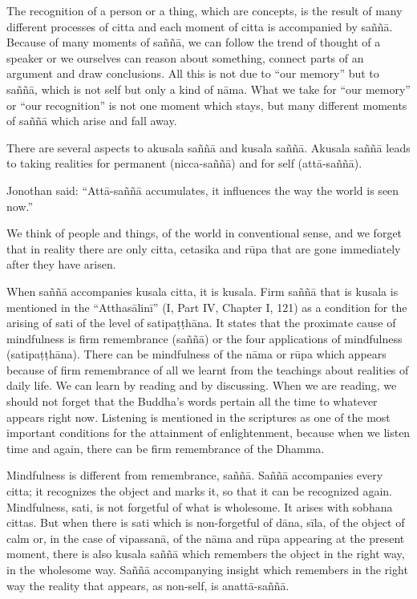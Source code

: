 The recognition of a person or a thing, which are concepts, is the
result of many different processes of citta and each moment of citta is
accompanied by saññā. Because of many moments of saññā, we can follow
the trend of thought of a speaker or we ourselves can reason about
something, connect parts of an argument and draw conclusions. All this
is not due to ``our memory'' but to saññā, which is not self but only a
kind of nāma. What we take for ``our memory'' or ``our recognition'' is
not one moment which stays, but many different moments of saññā which
arise and fall away.

There are several aspects to akusala saññā and kusala saññā. Akusala
saññā leads to taking realities for permanent (nicca-saññā) and for self
(attā-saññā).

Jonothan said: ``Attā-saññā accumulates, it influences the way the world
is seen now.''

We think of people and things, of the world in conventional sense, and
we forget that in reality there are only citta, cetasika and rūpa that
are gone immediately after they have arisen.

When saññā accompanies kusala citta, it is kusala. Firm saññā that is
kusala is mentioned in the ``Atthasālinī'' (I, Part IV, Chapter I, 121)
as a condition for the arising of sati of the level of satipaṭṭhāna. It
states that the proximate cause of mindfulness is firm remembrance
(saññā) or the four applications of mindfulness (satipaṭṭhāna). There
can be mindfulness of the nāma or rūpa which appears because of firm
remembrance of all we learnt from the teachings about realities of daily
life. We can learn by reading and by discussing. When we are reading, we
should not forget that the Buddha's words pertain all the time to
whatever appears right now. Listening is mentioned in the scriptures as
one of the most important conditions for the attainment of
enlightenment, because when we listen time and again, there can be firm
remembrance of the Dhamma.

Mindfulness is different from remembrance, saññā. Saññā accompanies
every citta; it recognizes the object and marks it, so that it can be
recognized again. Mindfulness, sati, is not forgetful of what is
wholesome. It arises with sobhana cittas. But when there is sati which
is non-forgetful of dāna, sīla, of the object of calm or, in the case of
vipassanā, of the nāma and rūpa appearing at the present moment, there
is also kusala saññā which remembers the object in the right way, in the
wholesome way. Saññā accompanying insight which remembers in the right
way the reality that appears, as non-self, is anattā-saññā.

